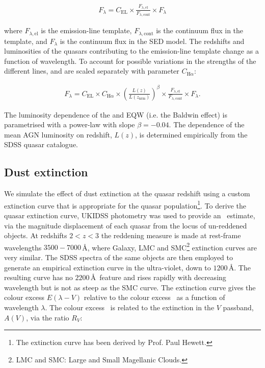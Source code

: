 \begingroup\makeatletter{}\check@mathfonts
\begin{eqnarray}
  F_{\lambda} =  C_{\text{EL}} \times \frac{F_{\lambda, \text{el}}}{F_{\lambda, \text{cont}}} \times F_{\lambda}
\end{eqnarray}
\endgroup

\noindent where $F_{\lambda, \text{el}}$ is the emission-line template, $F_{\lambda,\text{cont}}$ is the continuum flux in the template, and $F_{\lambda}$ is the continuum flux in the SED model.
The redshifts and luminosities of the quasars contributing to the emission-line template change as a function of wavelength.
To account for possible variations in the strengths of the different lines, \ha and \hb are scaled separately with parameter $C_{{\text{H}} \alpha}$:

\begingroup\makeatletter{}\check@mathfonts
\begin{eqnarray}
  F_{\lambda} =  C_{\text{EL}} \times C_{{\text{H}} \alpha} \times \left( \frac{L(z)} {L(z_{\text{nrm}})} \right)^{\beta} \times \frac{F_{\lambda, \text{el}}}{F_{\lambda, \text{cont}}} \times F_{\lambda}.
\end{eqnarray}
\endgroup

\noindent The luminosity dependence of the \ha and \hb EQW (i.e. the Baldwin effect) is parametrised with a power-law with slope $\beta=-0.04$.
The dependence of the mean AGN luminosity on redshift, $L(z)$, is determined empirically from the SDSS quasar catalogue.

\subsection{Dust extinction}
\label{sec:sed-extinction}

We simulate the effect of dust extinction at the quasar redshift using a custom extinction curve that is appropriate for the quasar population\footnote{The extinction curve has been derived by Prof. Paul Hewett.}.
To derive the quasar extinction curve, UKIDSS photometry was used to provide an \ebv\, estimate, via the magnitude displacement of each quasar from the locus of un-reddened objects.
At redshifts $2 < z < 3$ the reddening measure is made at rest-frame wavelengths $3500-7000$\,\AA, where Galaxy, LMC and SMC\footnote{LMC and SMC: Large and Small Magellanic Clouds.} extinction curves are very similar.
The SDSS spectra of the same objects are then employed to generate an empirical extinction curve in the ultra-violet, down to $1200$\,\AA.
The resulting curve has no $2200$\,\AA\, feature and rises rapidly with decreasing wavelength but is not as steep as the SMC curve.
The extinction curve gives the colour excess $E(\lambda-V)$ relative to the colour excess \ebv\, as a function of wavelength $\lambda$.
The colour excess \ebv\, is related to the extinction in the $V$ passband, $A(V)$, via the ratio $R_V$:

